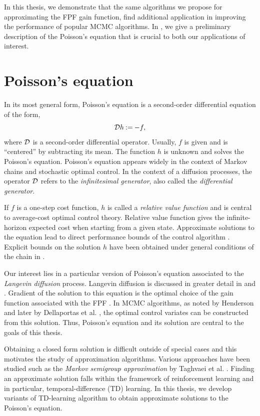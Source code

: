 In this thesis, we demonstrate that the same algorithms we propose for approximating the FPF gain function, find additional application in improving the performance of popular MCMC algorithms. In , we give a preliminary description of the Poisson's equation that is crucial to both our applications of interest.

\section{Poisson's equation} 
\label{poissons_eq}
In its most general form, Poisson's equation is a second-order differential equation of the form,
\begin{equation*}
{\cal D} h \mathbin{:=} - f,
\end{equation*}
where ${\cal D}$ is a second-order differential operator. Usually, $f$ is given and is ``centered'' by subtracting its mean. The function $h$ is unknown and solves the Poisson's equation. Poisson's equation appears widely in the context of Markov chains and stochastic optimal control. In the context of a diffusion processes, the operator ${\cal D}$ refers to the \textit{infinitesimal generator}, also called the \textit{differential generator}. 

If $f$ is a one-step cost function, $h$ is called a \textit{relative value function} and is central to average-cost optimal control theory.  Relative value function gives the infinite-horizon expected cost when starting from a given state. Approximate solutions to the equation lead to direct performance bounds of the control algorithm \cite{ctcn}. Explicit bounds on the solution $h$ have been obtained under general conditions of the chain in \cite{}.

Our interest lies in a particular version of Poisson's equation associated to the \textit{Langevin diffusion} process. Langevin diffusion is discussed in greater detail in  and . Gradient of the solution to this equation is the optimal choice of the gain function associated with the FPF \cite{yanmehmey13}. In MCMC algorithms, as noted by Henderson \cite{henthesis97} and later by Dellaportas et al. \cite{delkon12}, the optimal control variates can be constructed from this solution. Thus, Poisson's equation and its solution are central to the goals of this thesis. 

Obtaining a closed form solution is difficult outside of special cases and this motivates the study of approximation algorithms. Various approaches have been studied such as the \textit{Markov semigroup approximation} by Taghvaei et al. \cite{tagmeh16a}. Finding an approximate solution falls within the framework of reinforcement learning and in particular, temporal-difference (TD) learning. In this thesis, we develop variants of TD-learning algorithm to obtain approximate solutions to the Poisson's equation.

